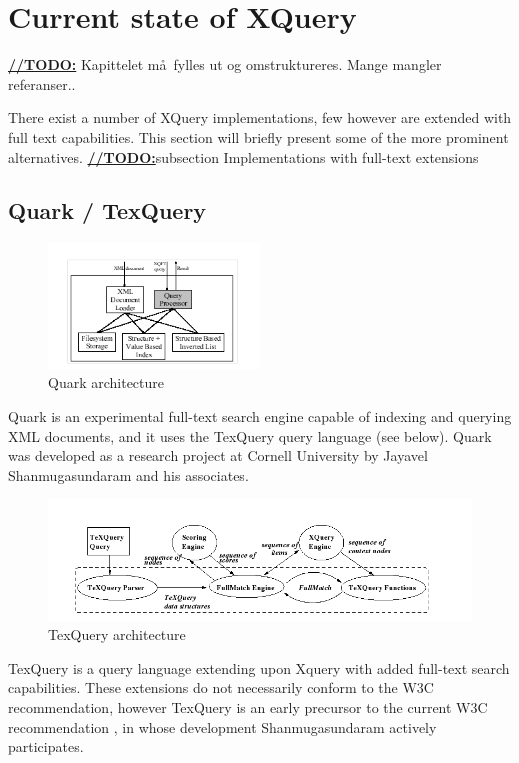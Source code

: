 \section{Current state of XQuery}
\underline{\textbf{\LARGE //TODO:}} Kapittelet m\aa~fylles ut og omstruktureres. Mange mangler referanser..

There exist a number of XQuery implementations, few however are extended with full text capabilities. This section will briefly present some of the more prominent alternatives.
\underline{\textbf{\LARGE //TODO:}}subsection Implementations with full-text extensions
\subsection{Quark / TexQuery}
\begin{figure}[!h]
  \centering
    \includegraphics[width=0.5\textwidth]{img/quark_architecture.png}
  \caption{Quark architecture}
\end{figure}
Quark is an experimental full-text search engine capable of indexing and querying XML documents, and it uses the TexQuery query language (see below). Quark was developed as a research project at Cornell University by Jayavel Shanmugasundaram and his associates.
\begin{figure}[!h]
  \centering
    \includegraphics[width=1\textwidth]{img/texquery_architecture.png}
  \caption{TexQuery architecture}
\end{figure}
TexQuery is a query language extending upon Xquery with added full-text search capabilities. These extensions do not necessarily conform to the W3C recommendation, however TexQuery is an early precursor to the current W3C recommendation \cite{TEXQ00}, in whose development Shanmugasundaram actively participates.


